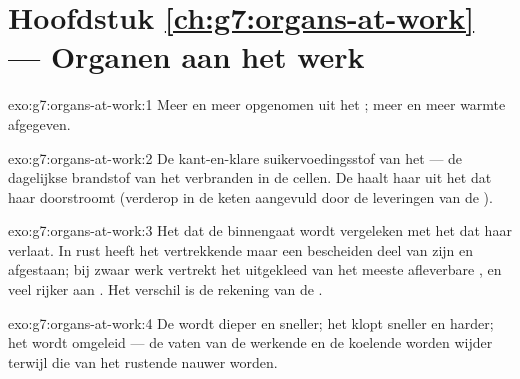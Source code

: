 \section*{Hoofdstuk \ref{ch:g7:organs-at-work} --- Organen aan het werk}

\begin{solution}{exo:g7:organs-at-work:1}
Meer  en meer  opgenomen uit het ; meer
 en meer warmte afgegeven.
\end{solution}

\begin{solution}{exo:g7:organs-at-work:2}
De kant-en-klare suikervoedingsstof van het  --- de dagelijkse
brandstof van het verbranden in de cellen. De  haalt haar uit het
 dat haar doorstroomt (verderop in de keten aangevuld door de
leveringen van de ).
\end{solution}

\begin{solution}{exo:g7:organs-at-work:3}
Het  dat de  binnengaat wordt vergeleken met het  dat haar
verlaat. In rust heeft het vertrekkende  maar een bescheiden deel van
zijn  en  afgestaan; bij zwaar werk vertrekt het uitgekleed
van het meeste afleverbare , en veel rijker aan .
Het verschil is de rekening van de .
\end{solution}

\begin{solution}{exo:g7:organs-at-work:4}
De  wordt dieper en sneller; het  klopt sneller en harder;
het  wordt omgeleid --- de vaten van de werkende  en de
koelende  worden wijder terwijl die van het rustende
 nauwer worden.
\end{solution}

